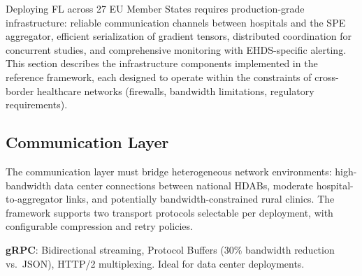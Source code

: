 \documentclass[conference,a4paper]{IEEEtran}
\begin{document}
Deploying FL across 27 EU Member States requires production-grade infrastructure: reliable communication channels between hospitals and the SPE aggregator, efficient serialization of gradient tensors, distributed coordination for concurrent studies, and comprehensive monitoring with EHDS-specific alerting. This section describes the infrastructure components implemented in the reference framework, each designed to operate within the constraints of cross-border healthcare networks (firewalls, bandwidth limitations, regulatory requirements).

\subsection{Communication Layer}

The communication layer must bridge heterogeneous network environments: high-bandwidth data center connections between national HDABs, moderate hospital-to-aggregator links, and potentially bandwidth-constrained rural clinics. The framework supports two transport protocols selectable per deployment, with configurable compression and retry policies.

\begin{figure}[htbp]
\centering
{}
\end{figure}

\textbf{gRPC}: Bidirectional streaming, Protocol Buffers (30\% bandwidth reduction vs.\ JSON), HTTP/2 multiplexing. Ideal for data center deployments.
\end{document}
